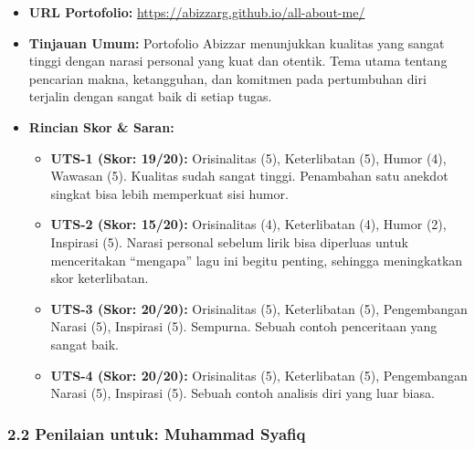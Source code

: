 \documentclass[
  letterpaper,
  DIV=11,
  numbers=noendperiod]{scrreprt}
\providecommand{\tightlist}{%
  \setlength{\itemsep}{0pt}\setlength{\parskip}{0pt}}
\begin{document}
\begin{itemize}
\tightlist
\item
  \textbf{URL Portofolio:}
  \url{https://abizzarg.github.io/all-about-me/}
\item
  \textbf{Tinjauan Umum:} Portofolio Abizzar menunjukkan kualitas yang
  sangat tinggi dengan narasi personal yang kuat dan otentik. Tema utama
  tentang pencarian makna, ketangguhan, dan komitmen pada pertumbuhan
  diri terjalin dengan sangat baik di setiap tugas.
\item
  \textbf{Rincian Skor \& Saran:}

  \begin{itemize}
  \tightlist
  \item
    \textbf{UTS-1 (Skor: 19/20):} Orisinalitas (5), Keterlibatan (5),
    Humor (4), Wawasan (5). Kualitas sudah sangat tinggi. Penambahan
    satu anekdot singkat bisa lebih memperkuat sisi humor.
  \item
    \textbf{UTS-2 (Skor: 15/20):} Orisinalitas (4), Keterlibatan (4),
    Humor (2), Inspirasi (5). Narasi personal sebelum lirik bisa
    diperluas untuk menceritakan ``mengapa'' lagu ini begitu penting,
    sehingga meningkatkan skor keterlibatan.
  \item
    \textbf{UTS-3 (Skor: 20/20):} Orisinalitas (5), Keterlibatan (5),
    Pengembangan Narasi (5), Inspirasi (5). Sempurna. Sebuah contoh
    penceritaan yang sangat baik.
  \item
    \textbf{UTS-4 (Skor: 20/20):} Orisinalitas (5), Keterlibatan (5),
    Pengembangan Narasi (5), Inspirasi (5). Sebuah contoh analisis diri
    yang luar biasa.
  \end{itemize}
\end{itemize}

\subsubsection{2.2 Penilaian untuk: Muhammad
Syafiq}\label{penilaian-untuk-muhammad-syafiq}
\end{document}
